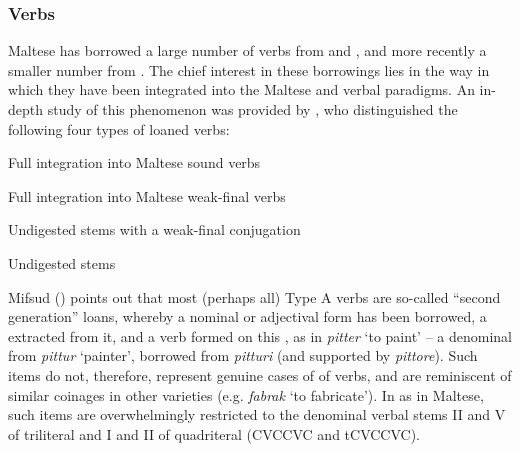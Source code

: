 \documentclass[output=paper]{langsci/langscibook}
\begin{document}
\subsubsection{Verbs}\label{verbmorphology}\largerpage

\label{loanedverbs}
Maltese has borrowed a large number of verbs from  and , and more recently a smaller number from . The chief interest in these borrowings lies in the way in which they have been integrated into the Maltese  and  verbal paradigms. An in-depth study of this phenomenon was provided by \cite{mifsudloanverbs}, who distinguished the following four types of loaned verbs:

\begin{description}[font=\normalfont,noitemsep,labelwidth={\widthof{Type D:}}]
	\item[Type A:] Full integration into  Maltese sound verbs
    \item[Type B:] Full integration into  Maltese weak-final verbs
    \item[Type C:] Undigested  stems with a weak-final conjugation
    \item[Type D:] Undigested  stems
\end{description}


Mifsud (\citeyear[58]{mifsudloanverbs}) points out that most (perhaps all) Type A verbs are so-called ``second generation'' loans, whereby a nominal or adjectival form has been borrowed, a  extracted from it, and a verb formed on this , as in \textit{pitter} `to paint' -- a denominal  from \textit{pittur} `painter', borrowed from  \textit{pitturi} (and supported by  \textit{pittore}). Such items do not, therefore, represent genuine cases of  of verbs, and are reminiscent of similar coinages in other  varieties (e.g. \textit{fabrak} `to fabricate'). In  as in Maltese, such items are overwhelmingly restricted to the denominal verbal stems II and V of triliteral  and I and II of quadriteral  (CVCCVC and tCVCCVC).
\end{document}
